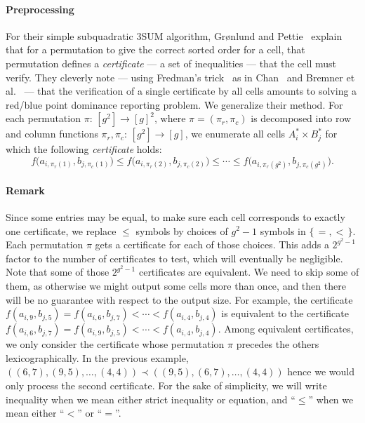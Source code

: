\paragraph{Preprocessing}
For their simple subquadratic 3SUM algorithm, Gr\o nlund and Pettie~\cite{GP18}
explain that for a permutation to give the correct sorted order for a cell, that
permutation defines a \emph{certificate} --- a set of inequalities --- that
the cell must verify. They cleverly note --- using Fredman's trick~\cite{Fr76}
as in Chan~\cite{Cha08} and Bremner et al.~\cite{BCDEHILPT14}
--- that the verification of a single certificate by all cells amounts to
solving a red/blue point dominance reporting problem.
We generalize their method.
For each permutation $\pi\colon\,[g^2]\to{[g]}^2$, where $\pi =
(\pi_r,\pi_c)$ is decomposed into row and column functions
$\pi_r,\pi_c\colon\,[g^2]\to[g]$, we enumerate all cells $A_i^* \times B_j^*$
for which the following \emph{certificate} holds:
\begin{displaymath}
	f\Big(a_{i,\pi_r(1)},b_{j,\pi_c(1)}\Big)
	\le
	f\Big(a_{i,\pi_r(2)},b_{j,\pi_c(2)}\Big)
	\le
	\cdots
	\le
	f\Big(a_{i,\pi_r(g^2)},b_{j,\pi_c(g^2)}\Big).
\end{displaymath}

\paragraph{Remark}
Since some entries may be equal, to make sure each cell corresponds to exactly
one certificate, we replace $\le$ symbols by choices of $g^2-1$ symbols in
$\{\,=,<\,\}$. Each permutation $\pi$ gets a certificate for each of
those choices.
This adds a $2^{g^2-1}$ factor to the number of certificates
to test, which will eventually be negligible.
Note that some of those $2^{g^2-1}$ certificates are equivalent. We
need to skip some of them, as otherwise we might output some cells more than
once, and then there will be no guarantee with respect to the output size. For
example, the certificate $f(a_{i,9},b_{j,5}) = f(a_{i,6},b_{j,7}) < \cdots <
f(a_{i,4},b_{j,4})$ is equivalent to the certificate $f(a_{i,6},b_{j,7}) =
f(a_{i,9},b_{j,5}) < \cdots < f(a_{i,4},b_{j,4})$. Among equivalent
certificates, we only consider the certificate whose permutation $\pi$ precedes
the others lexicographically. In the previous example,
$((6,7),(9,5),\ldots,(4,4)) \prec ((9,5),(6,7),\ldots,(4,4))$ hence we would
only process the second certificate. For the sake of simplicity,
we will write inequality when we mean either strict inequality or equation, and
``$\le$'' when we mean either ``$<$'' or ``$=$''.


